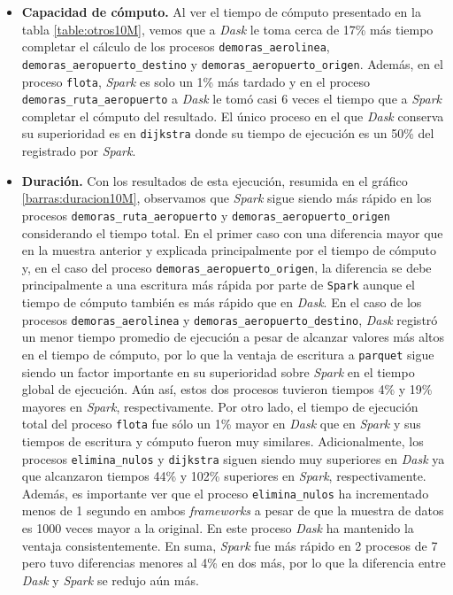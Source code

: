 \begin{itemize}
	\item \textbf{Capacidad de cómputo.} Al ver el tiempo de cómputo presentado en la tabla \ref{table:otros10M}, vemos que a \textit{Dask} le toma cerca de 17\% más tiempo completar el cálculo de los procesos \texttt{demoras\_aerolinea}, \texttt{demoras\_aeropuerto\_destino} y \texttt{demoras\_aeropuerto\_origen}. Además, en el proceso \texttt{flota}, \textit{Spark} es solo un 1\% más tardado y en el proceso \texttt{demoras\_ruta\_aeropuerto} a \textit{Dask} le tomó casi 6 veces el tiempo que a \textit{Spark} completar el cómputo del resultado. El único proceso en el que \textit{Dask} conserva su superioridad es en \texttt{dijkstra} donde su tiempo de ejecución es un 50\% del registrado por \textit{Spark}. 
	
	\item \textbf{Duración.} Con los resultados de esta ejecución, resumida en el gráfico \ref{barras:duracion10M}, observamos que \textit{Spark} sigue siendo más rápido en los procesos \texttt{demoras\_ruta\_aeropuerto} y \texttt{demoras\_aeropuerto\_origen} considerando el tiempo total. En el primer caso con una diferencia mayor que en la muestra anterior y explicada principalmente por el tiempo de cómputo y, en el caso del proceso \texttt{demoras\_aeropuerto\_origen}, la diferencia se debe principalmente a una escritura más rápida por parte de \texttt{Spark} aunque el tiempo de cómputo también es más rápido que en \textit{Dask}. En el caso de los procesos \texttt{demoras\_aerolinea} y \texttt{demoras\_aeropuerto\_destino}, \textit{Dask} registró un menor tiempo promedio de ejecución a pesar de alcanzar valores más altos en el tiempo de cómputo, por lo que la ventaja de escritura a \texttt{parquet} sigue siendo un factor importante en su superioridad sobre \textit{Spark} en el tiempo global de ejecución. Aún así, estos dos procesos tuvieron tiempos 4\% y 19\% mayores en \textit{Spark}, respectivamente. Por otro lado, el tiempo de ejecución total del proceso \texttt{flota} fue sólo un 1\% mayor en \textit{Dask} que en \textit{Spark} y sus tiempos de escritura y cómputo fueron muy similares. Adicionalmente, los procesos \texttt{elimina\_nulos} y \texttt{dijkstra} siguen siendo muy superiores en \textit{Dask} ya que alcanzaron tiempos 44\% y 102\% superiores en \textit{Spark}, respectivamente. Además, es importante ver que el proceso \texttt{elimina\_nulos} ha incrementado menos de 1 segundo en ambos \textit{frameworks} a pesar de que la muestra de datos es 1000 veces mayor a la original. En este proceso \textit{Dask} ha mantenido la ventaja consistentemente. En suma, \textit{Spark} fue más rápido en 2 procesos de 7 pero tuvo diferencias menores al 4\% en dos más, por lo que la diferencia entre \textit{Dask} y \textit{Spark} se redujo aún más.

\end{itemize}


